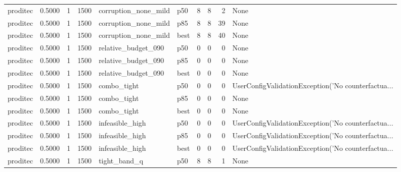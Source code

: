\begin{tabular}{lrrrllrrrl}
proditec &    0.5000 &    1 &   1500 & corruption\_none\_mild &    p50 &               8 &          8 &       2 &                                               None \\
proditec &    0.5000 &    1 &   1500 & corruption\_none\_mild &    p85 &               8 &          8 &      39 &                                               None \\
proditec &    0.5000 &    1 &   1500 & corruption\_none\_mild &   best &               8 &          8 &      40 &                                               None \\
proditec &    0.5000 &    1 &   1500 &  relative\_budget\_090 &    p50 &               0 &          0 &       0 &                                               None \\
proditec &    0.5000 &    1 &   1500 &  relative\_budget\_090 &    p85 &               0 &          0 &       0 &                                               None \\
proditec &    0.5000 &    1 &   1500 &  relative\_budget\_090 &   best &               0 &          0 &       0 &                                               None \\
proditec &    0.5000 &    1 &   1500 &          combo\_tight &    p50 &               0 &          0 &       0 & UserConfigValidationException('No counterfactua... \\
proditec &    0.5000 &    1 &   1500 &          combo\_tight &    p85 &               0 &          0 &       0 &                                               None \\
proditec &    0.5000 &    1 &   1500 &          combo\_tight &   best &               0 &          0 &       0 &                                               None \\
proditec &    0.5000 &    1 &   1500 &      infeasible\_high &    p50 &               0 &          0 &       0 & UserConfigValidationException('No counterfactua... \\
proditec &    0.5000 &    1 &   1500 &      infeasible\_high &    p85 &               0 &          0 &       0 & UserConfigValidationException('No counterfactua... \\
proditec &    0.5000 &    1 &   1500 &      infeasible\_high &   best &               0 &          0 &       0 & UserConfigValidationException('No counterfactua... \\
proditec &    0.5000 &    1 &   1500 &         tight\_band\_q &    p50 &               8 &          8 &       1 &                                               None \\

\end{tabular}
